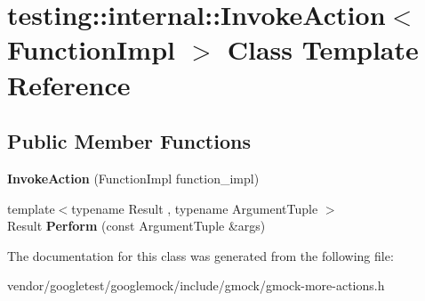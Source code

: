 \hypertarget{classtesting_1_1internal_1_1_invoke_action}{}\section{testing\+:\+:internal\+:\+:Invoke\+Action$<$ Function\+Impl $>$ Class Template Reference}
\label{classtesting_1_1internal_1_1_invoke_action}
\subsection*{Public Member Functions}
\begin{DoxyCompactItemize}
\item 
\mbox{\label{classtesting_1_1internal_1_1_invoke_action_a786ce772624fc87a31891f465df7ce61}} 
{\bfseries Invoke\+Action} (Function\+Impl function\+\_\+impl)
\item 
\mbox{\label{classtesting_1_1internal_1_1_invoke_action_af357ce691795b3520de1fda4ab8af8b2}} 
{\footnotesize template$<$typename Result , typename Argument\+Tuple $>$ }\\Result {\bfseries Perform} (const Argument\+Tuple \&args)
\end{DoxyCompactItemize}


The documentation for this class was generated from the following file\+:\begin{DoxyCompactItemize}
\item 
vendor/googletest/googlemock/include/gmock/gmock-\/more-\/actions.\+h\end{DoxyCompactItemize}
